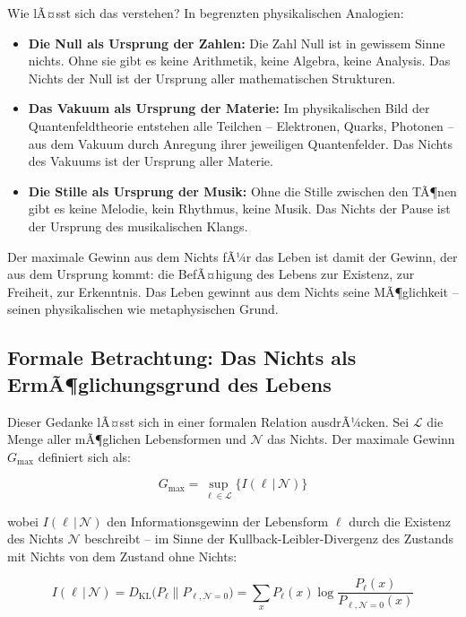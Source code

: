﻿\documentclass[12pt,a4paper]{report}
\begin{document}
Wie lÃ¤sst sich das verstehen? In begrenzten physikalischen Analogien:

\begin{itemize}
	\item \textbf{Die Null als Ursprung der Zahlen:} Die Zahl Null ist in gewissem Sinne \glqq nichts\grqq{}. Ohne sie gibt es keine Arithmetik, keine Algebra, keine Analysis. Das Nichts der Null ist der Ursprung aller mathematischen Strukturen.

	\item \textbf{Das Vakuum als Ursprung der Materie:} Im physikalischen Bild der Quantenfeldtheorie entstehen alle Teilchen -- Elektronen, Quarks, Photonen -- aus dem Vakuum durch Anregung ihrer jeweiligen Quantenfelder. Das Nichts des Vakuums ist der Ursprung aller Materie.

	\item \textbf{Die Stille als Ursprung der Musik:} Ohne die Stille zwischen den TÃ¶nen gibt es keine Melodie, kein Rhythmus, keine Musik. Das Nichts der Pause ist der Ursprung des musikalischen Klangs.
\end{itemize}

Der maximale Gewinn aus dem Nichts fÃ¼r das Leben ist damit der Gewinn, der aus dem Ursprung kommt: die BefÃ¤higung des Lebens zur Existenz, zur Freiheit, zur Erkenntnis. Das Leben gewinnt aus dem Nichts seine MÃ¶glichkeit -- seinen physikalischen wie metaphysischen Grund.

\subsection{Formale Betrachtung: Das Nichts als ErmÃ¶glichungsgrund des Lebens}

Dieser Gedanke lÃ¤sst sich in einer formalen Relation ausdrÃ¼cken. Sei $\mathcal{L}$ die Menge aller mÃ¶glichen Lebensformen und $\mathcal{N}$ das Nichts. Der maximale Gewinn $G_{\max}$ definiert sich als:

\begin{equation}
	G_{\max} = \sup_{\ell \in \mathcal{L}} \bigl\{I(\ell\,|\,\mathcal{N})\bigr\}
	\label{eq:max_gewinn}
\end{equation}

wobei $I(\ell\,|\,\mathcal{N})$ den Informationsgewinn der Lebensform $\ell$ durch die Existenz des Nichts $\mathcal{N}$ beschreibt -- im Sinne der Kullback-Leibler-Divergenz des Zustands mit Nichts von dem Zustand ohne Nichts:

\begin{equation}
	I(\ell\,|\,\mathcal{N}) = D_{\text{KL}}\bigl(P_\ell \| P_{\ell,\mathcal{N}=0}\bigr) = \sum_x P_\ell(x) \log \frac{P_\ell(x)}{P_{\ell,\mathcal{N}=0}(x)}
	\label{eq:kl_divergenz}
\end{equation}
\end{document}
